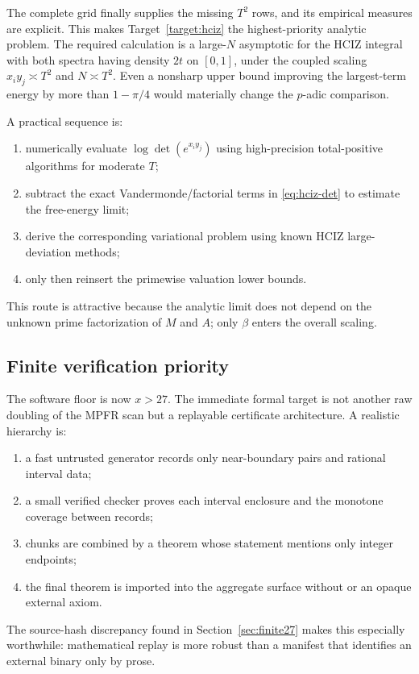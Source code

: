 \documentclass[11pt,oneside]{article}
\theoremstyle{definition}
\theoremstyle{remark}
\newcommand{\lean}[1]{\texttt{\detokenize{#1}}}
\begin{document}
The complete grid finally supplies the missing $T^2$ rows, and its empirical measures are
explicit.  This makes Target~\ref{target:hciz} the highest-priority analytic problem.  The
required calculation is a large-$N$ asymptotic for the HCIZ integral with both spectra having
density $2t$ on $[0,1]$, under the coupled scaling $x_i y_j\asymp T^2$ and
$N\asymp T^2$.  Even a nonsharp upper bound improving the largest-term energy by more than
$1-\pi/4$ would materially change the $p$-adic comparison.

A practical sequence is:
\begin{enumerate}
\item numerically evaluate $\log\det(e^{x_i y_j})$ using high-precision total-positive
      algorithms for moderate $T$;
\item subtract the exact Vandermonde/factorial terms in \eqref{eq:hciz-det} to estimate the
      free-energy limit;
\item derive the corresponding variational problem using known HCIZ large-deviation methods;
\item only then reinsert the primewise valuation lower bounds.
\end{enumerate}
This route is attractive because the analytic limit does not depend on the unknown prime
factorization of $M$ and $A$; only $\beta$ enters the overall scaling.

\subsection{Finite verification priority}

The software floor is now $x>27$.  The immediate formal target is not another raw doubling of
the MPFR scan but a replayable certificate architecture.  A realistic hierarchy is:
\begin{enumerate}
\item a fast untrusted generator records only near-boundary pairs and rational interval data;
\item a small verified checker proves each interval enclosure and the monotone coverage between
      records;
\item chunks are combined by a theorem whose statement mentions only integer endpoints;
\item the final theorem is imported into the aggregate surface without
      \lean{native\_decide} or an opaque external axiom.
\end{enumerate}
The source-hash discrepancy found in Section~\ref{sec:finite27} makes this especially
worthwhile: mathematical replay is more robust than a manifest that identifies an external
binary only by prose.
\end{document}

